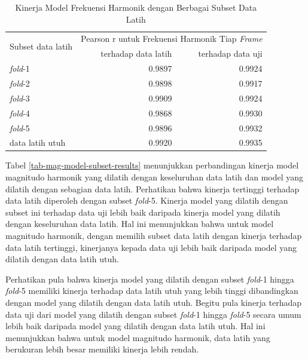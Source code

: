 \begin{table}[htbp]
    \centering
    \caption{Kinerja Model Frekuensi Harmonik dengan Berbagai Subset Data Latih}\label{tab-freq-model-subset-results}
    \begin{tabular}{ |l|r|r| } 
     \hline
     \multirow{2}{*}{Subset data latih} & \multicolumn{2}{l|}{Pearson r untuk Frekuensi Harmonik Tiap \textit{Frame}} \\
     \cline{2-3}
     & terhadap data latih & terhadap data uji \\\hline
	\textit{fold}-1      &0.9897  &0.9924\\\hline
	\textit{fold}-2      &0.9898  &0.9917\\\hline
	\textit{fold}-3      &0.9909  &0.9924\\\hline
	\textit{fold}-4      &0.9868  &0.9930\\\hline
	\textit{fold}-5      &0.9896  &0.9932\\\hline
	data latih utuh      &0.9920  &0.9935\\\hline
    \end{tabular}
\end{table}

Tabel \ref{tab-mag-model-subset-results} menunjukkan perbandingan kinerja model magnitudo harmonik yang dilatih dengan keseluruhan data latih dan model yang dilatih dengan sebagian data latih. Perhatikan bahwa kinerja tertinggi terhadap data latih diperoleh dengan subset \textit{fold}-5. Kinerja model yang dilatih dengan subset ini terhadap data uji lebih baik daripada kinerja model yang dilatih dengan keseluruhan data latih. Hal ini menunjukkan bahwa untuk model magnitudo harmonik, dengan memilih subset data latih dengan kinerja terhadap data latih tertinggi, kinerjanya kepada data uji lebih baik daripada model yang dilatih dengan data latih utuh. 

Perhatikan pula bahwa kinerja model yang dilatih dengan subset \textit{fold}-1 hingga \textit{fold}-5 memiliki kinerja terhadap data latih utuh yang lebih tinggi dibandingkan dengan model yang dilatih dengan data latih utuh. Begitu pula kinerja terhadap data uji dari model yang dilatih dengan subset \textit{fold}-1 hingga \textit{fold}-5 secara umum lebih baik daripada model yang dilatih dengan data latih utuh. Hal ini menunjukkan bahwa untuk model magnitudo harmonik, data latih yang berukuran lebih besar memiliki kinerja lebih rendah.

